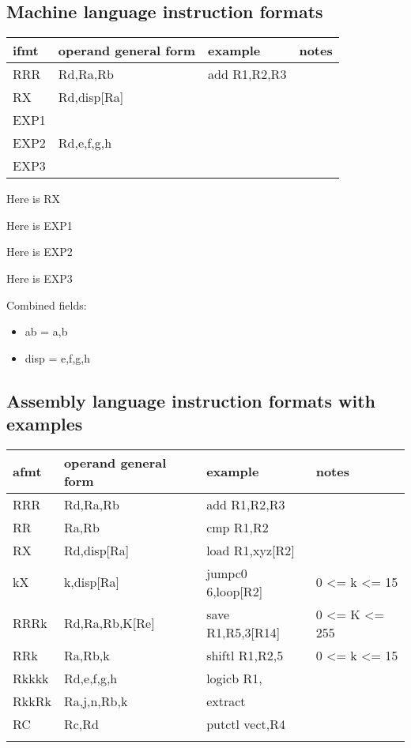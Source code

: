 \documentclass[11pt]{article}
\begin{document}
\subsection*{Machine language instruction formats}
\label{sec:orgf184b34}

\begin{center}
\begin{tabular}{llll}
ifmt & operand general form & example & notes\\
\hline
RRR & Rd,Ra,Rb & add R1,R2,R3 & \\
RX & Rd,disp[Ra] &  & \\
EXP1 &  &  & \\
EXP2 & Rd,e,f,g,h &  & \\
EXP3 &  &  & \\
\end{tabular}
\end{center}


Here is RX

Here is EXP1

Here is EXP2

Here is EXP3

Combined fields:
\begin{itemize}
\item ab = a,b
\item disp = e,f,g,h
\end{itemize}

\subsection*{Assembly language instruction formats with examples}
\label{sec:org0c988d5}

\begin{center}
\begin{tabular}{llll}
afmt & operand general form & example & notes\\
\hline
RRR & Rd,Ra,Rb & add R1,R2,R3 & \\
RR & Ra,Rb & cmp R1,R2 & \\
RX & Rd,disp[Ra] & load R1,xyz[R2] & \\
kX & k,disp[Ra] & jumpc0 6,loop[R2] & 0 <= k <= 15\\
RRRk & Rd,Ra,Rb,K[Re] & save R1,R5,3[R14] & 0 <= K <= 255\\
RRk & Ra,Rb,k & shiftl R1,R2,5 & 0 <= k <= 15\\
Rkkkk & Rd,e,f,g,h & logicb R1, & \\
RkkRk & Ra,j,n,Rb,k & extract & \\
RC & Rc,Rd & putctl vect,R4 & \\
 &  &  & \\
\end{tabular}
\end{center}
\end{document}
